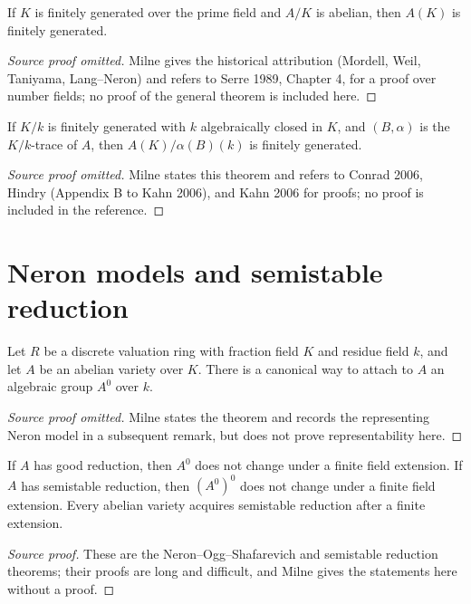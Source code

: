 \begin{theorem}\label{thm:milne-mordell-weil}
If $K$ is finitely generated over the prime field and $A/K$ is abelian, then $A(K)$ is finitely generated.
\end{theorem}
\begin{proof}[Source proof omitted]
Milne gives the historical attribution (Mordell, Weil, Taniyama, Lang--Neron)
and refers to Serre 1989, Chapter 4, for a proof over number fields; no proof
of the general theorem is included here.
\end{proof}
\begin{theorem}\label{thm:milne-lang-neron}
If $K/k$ is finitely generated with $k$ algebraically closed in $K$, and $(B,\alpha)$ is the $K/k$-trace of $A$, then $A(K)/\alpha(B)(k)$ is finitely generated.
\end{theorem}
\begin{proof}[Source proof omitted]
Milne states this theorem and refers to Conrad 2006, Hindry (Appendix B to
Kahn 2006), and Kahn 2006 for proofs; no proof is included in the reference.
\end{proof}

\section{Neron models and semistable reduction}
\begin{theorem}\label{thm:milne-neron-model}
Let $R$ be a discrete valuation ring with fraction field $K$ and residue field
$k$, and let $A$ be an abelian variety over $K$.  There is a canonical way
to attach to $A$ an algebraic group $A^0$ over $k$.
\end{theorem}
\begin{proof}[Source proof omitted]
Milne states the theorem and records the representing Neron model in a
subsequent remark, but does not prove representability here.
\end{proof}
\begin{theorem}\label{thm:milne-semistable-reduction}
If $A$ has good reduction, then $A^0$ does not change under a finite field
extension.  If $A$ has semistable reduction, then $(A^0)^0$ does not change
under a finite field extension.  Every abelian variety acquires semistable
reduction after a finite extension.
\end{theorem}
\begin{proof}[Source proof]
These are the Neron--Ogg--Shafarevich and semistable reduction theorems; their
proofs are long and difficult, and Milne gives the statements here without a
proof.
\end{proof}

